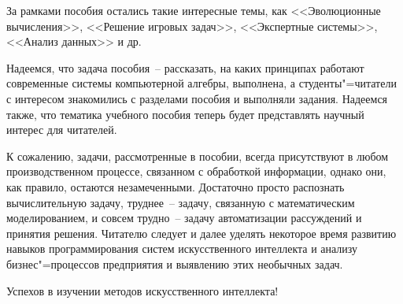 \documentclass[a4paper,14pt, openany, twoside, final]{extbook} %
\begin{document}
За рамками пособия остались такие интересные темы, как <<Эволюционные вычисления>>, <<Решение игровых задач>>, <<Экспертные системы>>, <<Анализ данных>> и др.

Надеемся, что задача пособия~-- рассказать, на каких принципах работают современные системы компьютерной алгебры, выполнена, а студенты"=читатели с интересом знакомились с разделами пособия и выполняли задания.  Надеемся также, что тематика учебного пособия теперь будет представлять научный интерес для читателей.

К сожалению, задачи, рассмотренные в пособии, всегда присутствуют в любом производственном процессе, связанном с обработкой информации, однако они, как правило, остаются незамеченными.  Достаточно просто распознать вычислительную задачу, труднее~-- задачу, связанную с математическим моделированием, и совсем трудно~-- задачу автоматизации рассуждений и принятия решения.  Читателю следует и далее уделять некоторое время развитию навыков программирования систем искусственного интеллекта и анализу бизнес"=процессов предприятия и выявлению этих необычных задач.

Успехов в изучении методов искусственного интеллекта!
\end{document}
